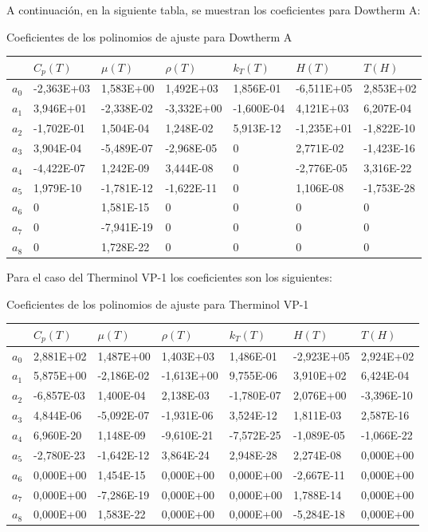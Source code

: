 \documentclass[11pt]{article}
\begin{document}
A continuación, en la siguiente tabla, se muestran los coeficientes para
Dowtherm A:

Coeficientes de los polinomios de ajuste para Dowtherm A

\begin{longtable}[]{@{}lllllll@{}}
\toprule
& \(C_p(T)\) & \(\mu(T)\) & \(\rho(T)\) & \(k_T(T)\) & \(H(T)\) &
\(T(H)\)\tabularnewline
\midrule
\endhead
\(a_0\) & -2,363E+03 & 1,583E+00 & 1,492E+03 & 1,856E-01 & -6,511E+05 &
2,853E+02\tabularnewline
\(a_1\) & 3,946E+01 & -2,338E-02 & -3,332E+00 & -1,600E-04 & 4,121E+03 &
6,207E-04\tabularnewline
\(a_2\) & -1,702E-01 & 1,504E-04 & 1,248E-02 & 5,913E-12 & -1,235E+01 &
-1,822E-10\tabularnewline
\(a_3\) & 3,904E-04 & -5,489E-07 & -2,968E-05 & 0 & 2,771E-02 &
-1,423E-16\tabularnewline
\(a_4\) & -4,422E-07 & 1,242E-09 & 3,444E-08 & 0 & -2,776E-05 &
3,316E-22\tabularnewline
\(a_5\) & 1,979E-10 & -1,781E-12 & -1,622E-11 & 0 & 1,106E-08 &
-1,753E-28\tabularnewline
\(a_6\) & 0 & 1,581E-15 & 0 & 0 & 0 & 0\tabularnewline
\(a_7\) & 0 & -7,941E-19 & 0 & 0 & 0 & 0\tabularnewline
\(a_8\) & 0 & 1,728E-22 & 0 & 0 & 0 & 0\tabularnewline
\bottomrule
\end{longtable}

Para el caso del Therminol VP-1 los coeficientes son los siguientes:

Coeficientes de los polinomios de ajuste para Therminol VP-1

\begin{longtable}[]{@{}lllllll@{}}
\toprule
& \(C_p(T)\) & \(\mu(T)\) & \(\rho(T)\) & \(k_T(T)\) & \(H(T)\) &
\(T(H)\)\tabularnewline
\midrule
\endhead
\(a_0\) & 2,881E+02 & 1,487E+00 & 1,403E+03 & 1,486E-01 & -2,923E+05 &
2,924E+02\tabularnewline
\(a_1\) & 5,875E+00 & -2,186E-02 & -1,613E+00 & 9,755E-06 & 3,910E+02 &
6,424E-04\tabularnewline
\(a_2\) & -6,857E-03 & 1,400E-04 & 2,138E-03 & -1,780E-07 & 2,076E+00 &
-3,396E-10\tabularnewline
\(a_3\) & 4,844E-06 & -5,092E-07 & -1,931E-06 & 3,524E-12 & 1,811E-03 &
2,587E-16\tabularnewline
\(a_4\) & 6,960E-20 & 1,148E-09 & -9,610E-21 & -7,572E-25 & -1,089E-05 &
-1,066E-22\tabularnewline
\(a_5\) & -2,780E-23 & -1,642E-12 & 3,864E-24 & 2,948E-28 & 2,274E-08 &
0,000E+00\tabularnewline
\(a_6\) & 0,000E+00 & 1,454E-15 & 0,000E+00 & 0,000E+00 & -2,667E-11 &
0,000E+00\tabularnewline
\(a_7\) & 0,000E+00 & -7,286E-19 & 0,000E+00 & 0,000E+00 & 1,788E-14 &
0,000E+00\tabularnewline
\(a_8\) & 0,000E+00 & 1,583E-22 & 0,000E+00 & 0,000E+00 & -5,284E-18 &
0,000E+00\tabularnewline
\bottomrule
\end{longtable}
\end{document}
